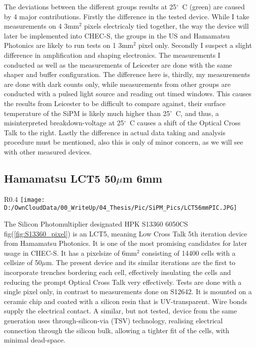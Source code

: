 \documentclass[12pt,article,type=msc,colorback,accentcolor=tud9c]{tudthesis}
\begin{document}
The deviations between the different groups results at 25${^\circ}$~C (green) are caused by 4 major contributions. Firstly the difference in the tested device. While I take measurements on 4 3mm$^2$ pixels electricaly tied together, the way the device will later be implemented into CHEC-S, the groups in the US and Hamamatsu Photonics are likely to run tests on 1 3mm$^2$ pixel only. Secondly I suspect a slight difference in amplification and shaping electronics. The measurements I conducted as well as the measurements of Leicester are done with the same shaper and buffer configuration. The difference here is, thirdly, my measurements are done with dark counts only, while measurements from other groups are conducted with a pulsed light source and reading out timed windows. This causes the results from Leicester to be difficult to compare against, their surface temperature of the SiPM is likely much higher than 25${^\circ}$~C, and thus, a misinterpreted breakdown-voltage at 25${^\circ}$~C causes a shift of the Optical Cross Talk to the right. Lastly the difference in actual data taking and analysis procedure must be mentioned, also this is only of minor concern, as we will see with other measured devices.






\clearpage
\subsection{Hamamatsu LCT5 50$\mu$m 6mm}
\label{subsec:LCT56}
\begin{wrapfigure}{R}{0.4\textwidth}
\centering
\texttt{[image: D:/OwnCloudData/00\_WriteUp/04\_Thesis/Pic/SiPM\_Pics/LCT56mmPIC.JPG]}
\caption{\label{fig:S13360_pixel}HPK S13360 6050CS pixel}
\end{wrapfigure}

The Silicon Photomultiplier designated HPK S13360 6050CS fig(\ref{fig:S13360_pixel}) is an LCT5, meaning Low Cross Talk 5th iteration device from Hamamatsu Photonics. It is one of the most promising candidates for later usage in CHEC-S. It has a pixelsize of 6mm$^2$ consisting of 14400 cells with a cellsize of 50$\mu$m. The present device and its similar iterations are the first to incorporate trenches bordering each cell, effectively insulating the cells and reducing the prompt Optical Cross Talk very effectively. Tests are done with a single pixel only, in contrast to measurements done on S12642. It is mounted on a ceramic chip and coated with a silicon resin that is UV-transparent. Wire bonds supply the electrical contact. A similar, but not tested, device from the same generation uses through-silicon-via (TSV) technology, realising electrical connection through the silicon bulk, allowing a tighter fit of the cells, with minimal dead-space.
\end{document}
